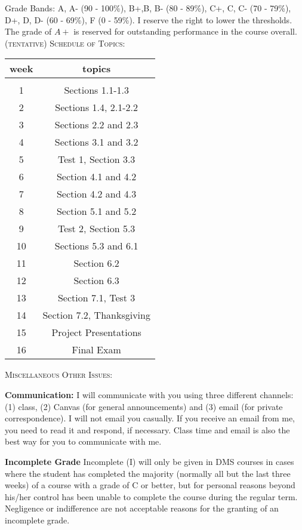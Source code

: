 \documentclass[11pt]{article}
\begin{document}
Grade Bands: A, A- (90 - 100\%), B+,B, B- (80 - 89\%), C+, C, C- (70 - 79\%), D+, D, D-
(60 - 69\%), F (0 - 59\%).  I reserve the right to lower the thresholds. The grade of $A+$ is reserved for outstanding performance in the course overall.\\

\textsc{(tentative) Schedule of Topics:}

\begin{tabular}{c | c}
week & topics \\
\hline \hline\\
1& Sections 1.1-1.3\\ \hline
2& Sections 1.4, 2.1-2.2\\ \hline
3& Sections 2.2 and 2.3\\ \hline
4& Sections 3.1 and 3.2\\ \hline
5& Test 1, Section 3.3\\ \hline
6& Section 4.1 and 4.2\\ \hline
7& Section 4.2 and 4.3\\ \hline
8& Section 5.1 and 5.2\\ \hline
9& Test 2, Section 5.3\\ \hline
10& Sections 5.3 and 6.1\\ \hline
11& Section 6.2\\ \hline
12& Section 6.3\\ \hline
13& Section 7.1, Test 3 \\ \hline
14& Section 7.2, Thanksgiving\\ \hline
15& Project Presentations\\ \hline
16& Final Exam\\ 
\end{tabular}

\textsc{Miscellaneous Other Issues:}

\textbf{Communication:} I will communicate with you using three different channels: (1) class, (2) Canvas (for general announcements) and (3) email (for private correspondence). I will not email you casually. If you receive an email from me, you need to read it and respond, if necessary.  Class time and email is also the best way for you to communicate with me. 

\textbf{Incomplete Grade} 
Incomplete (I) will only be given in DMS courses in cases where the student has completed the majority (normally all but the last three weeks) of a course with a grade of C or better, but for personal reasons beyond his/her control has been unable to complete the course during the regular term. Negligence or indifference are not acceptable reasons for the granting of an incomplete grade. 
\end{document}
